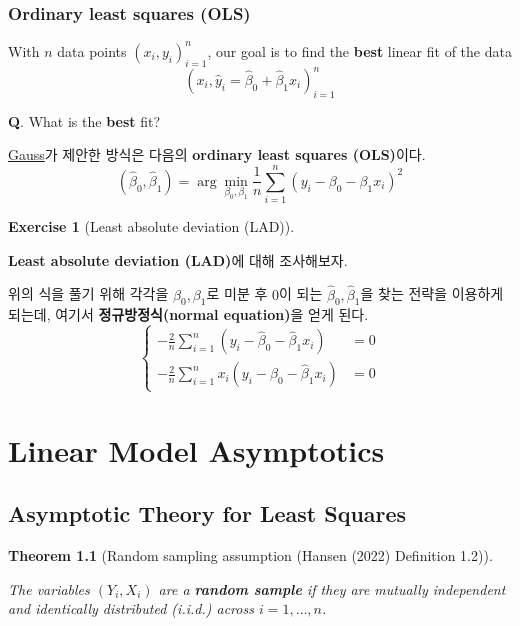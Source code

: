 \documentclass[
  letterpaper,
  DIV=11,
  numbers=noendperiod]{scrreprt}
\theoremstyle{definition}
\theoremstyle{plain}
\newtheorem{theorem}{Theorem}[chapter]
\theoremstyle{definition}
\theoremstyle{definition}
\newtheorem{exercise}{Exercise}[chapter]
\theoremstyle{remark}
\begin{document}
\section{Ordinary least squares (OLS)}\label{ordinary-least-squares-ols}

With \(n\) data points \((x_i, y_i)_{i=1}^n\), our goal is to find the
\textbf{best} linear fit of the data \[
(x_i, \hat{y}_i = \hat{\beta}_0 + \hat{\beta}_1 x_i)_{i=1}^n
\]

\textbf{Q}. What is the \textbf{best} fit?

\href{https://en.wikipedia.org/wiki/Carl_Friedrich_Gauss}{Gauss}가
제안한 방식은 다음의 \textbf{ordinary least squares (OLS)}이다. \[
(\hat{\beta}_0, \hat{\beta}_1) = \arg\min_{\beta_0, \beta_1} \frac{1}{n}\sum_{i=1}^n (y_i - \beta_0 -\beta_1 x_i)^2
\]

\begin{exercise}[Least absolute deviation
(LAD)]\protect\hypertarget{exr-OLS01}{}\label{exr-OLS01}

\textbf{Least absolute deviation (LAD)}에 대해 조사해보자.

\end{exercise}

위의 식을 풀기 위해 각각을 \(\beta_0, \beta_1\)로 미분 후 \(0\)이 되는
\(\hat{\beta}_0, \hat{\beta}_1\)을 찾는 전략을 이용하게 되는데, 여기서
\textbf{정규방정식(normal equation)}을 얻게 된다. \[
\begin{cases}
-\frac{2}{n}\sum_{i=1}^n (y_i - \hat{\beta}_0 - \hat{\beta}_1 x_i) &=0\\
-\frac{2}{n}\sum_{i=1}^n x_i(y_i - \hat{\beta}_0 - \hat{\beta}_1 x_i) &=0
\end{cases}
\]

\part{Linear Model Asymptotics}

\chapter{Asymptotic Theory for Least
Squares}\label{asymptotic-theory-for-least-squares}

\begin{theorem}[Random sampling assumption (Hansen (2022) Definition
1.2)]\protect\hypertarget{thm-rss}{}\label{thm-rss}

The variables \((Y_i, X_i)\) are a \textbf{random sample} if they are
mutually independent and identically distributed (i.i.d.) across
\(i=1,\ldots, n\).

\end{theorem}
\end{document}

